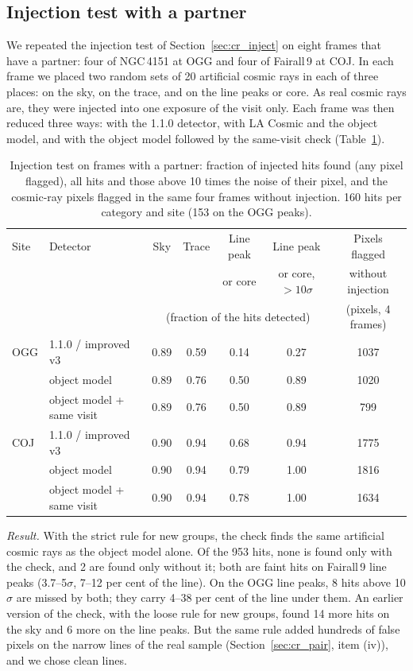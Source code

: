 \subsection{Injection test with a partner}
\label{sec:cr_pair_inject}
We repeated the injection test of Section~\ref{sec:cr_inject} on eight frames that have a partner: four of NGC\,4151
at OGG and four of Fairall\,9 at COJ. In each frame we placed two random sets of 20 artificial cosmic rays in each of three
places: on the sky, on the trace, and on the line peaks or core. As real cosmic rays
are, they were injected into one exposure of the visit only. Each frame was then reduced three ways: with the 1.1.0
detector, with LA Cosmic and the object model, and with the object model followed by the same-visit check
(Table~\ref{tab:cr_pair_inject}).

\begin{table}[!htbp]
\centering\small
\caption{Injection test on frames with a partner: fraction of injected hits found (any pixel flagged), all hits and
those above 10 times the noise of their pixel, and the cosmic-ray pixels flagged in the same four frames without
injection. 160 hits per category and site (153 on the OGG peaks).}
\label{tab:cr_pair_inject}
\begin{tabular}{llccccc}
\toprule
Site & Detector & Sky & Trace & Line peak & Line peak & Pixels flagged \\
 & & & & or core & or core, $>10\sigma$ & without injection \\
 & & \multicolumn{4}{c}{(fraction of the hits detected)} & (pixels, 4 frames) \\
\midrule
OGG & 1.1.0 / improved v3 & 0.89 & 0.59 & 0.14 & 0.27 & 1037\\
    & object model & 0.89 & 0.76 & 0.50 & 0.89 & 1020\\
    & object model + same visit & 0.89 & 0.76 & 0.50 & 0.89 & 799\\
\midrule
COJ & 1.1.0 / improved v3 & 0.90 & 0.94 & 0.68 & 0.94 & 1775\\
    & object model & 0.90 & 0.94 & 0.79 & 1.00 & 1816\\
    & object model + same visit & 0.90 & 0.94 & 0.78 & 1.00 & 1634\\
\bottomrule
\end{tabular}
\end{table}

\textit{Result.} With the strict rule for new groups, the check finds the same artificial cosmic rays as the object
model alone. Of the 953 hits, none is found only with the check, and 2 are found only without it; both are faint hits on
Fairall\,9 line peaks (3.7--5$\sigma$, 7--12 per cent of the line). On the OGG line peaks, 8 hits above 10$\sigma$ are
missed by both; they carry 4--38 per cent of the line under them. An earlier version of the check, with the loose rule
for new groups, found 14 more hits on the sky and 6 more on the line peaks. But the same rule added hundreds of false
pixels on the narrow lines of the real sample (Section~\ref{sec:cr_pair}, item (iv)), and we chose clean lines.

